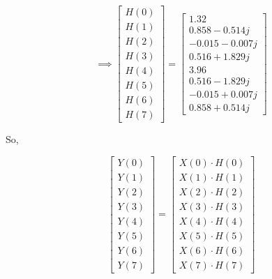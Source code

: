 \documentclass[journal,12pt,twocolumn]{IEEEtran}
\renewcommand\thesection{\arabic{section}}
\begin{document}
\begin{enumerate}[label=\thesection.\arabic*.,ref=\thesection.\theenumi]
\begin{equation}
\implies
\begin{bmatrix}
H(0) \\
H(1) \\
H(2) \\
H(3) \\
H(4) \\
H(5) \\
H(6) \\
H(7)
\end{bmatrix}
=
\begin{bmatrix}
1.32 \\
0.858 - 0.514j \\
-0.015-0.007j \\
0.516 +1.829j \\
3.96 \\
0.516 - 1.829j \\
-0.015+0.007j  \\
0.858 + 0.514j
\end{bmatrix}
\end{equation}

So,

\begin{equation}
\begin{bmatrix} 
Y(0) \\ Y(1) \\ Y(2) \\ Y(3) \\ Y(4) \\ Y(5) \\ Y(6) \\ Y(7) 
\end{bmatrix}
=
\begin{bmatrix}
X(0)\cdot H(0) \\ X(1)\cdot H(1) \\ X(2)\cdot H(2) \\ X(3)\cdot H(3) \\ X(4)\cdot H(4) \\ X(5)\cdot H(5) \\ X(6)\cdot H(6) \\ X(7)\cdot H(7)
\end{bmatrix}
\end{equation}






\end{enumerate}
\end{document}
